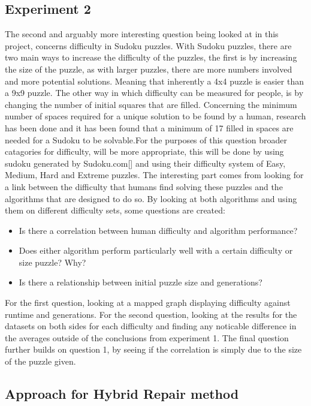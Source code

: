 \documentclass[a4paper,11pt]{article}
\begin{document}
\subsection{Experiment 2}
The second and arguably more interesting question being looked at in this project, concerns difficulty in Sudoku puzzles. With Sudoku puzzles, there are two main ways to increase the difficulty of the puzzles, the first is by increasing the size of the puzzle, as with larger puzzles, there are more numbers involved and more potential solutions. Meaning that inherently a 4x4 puzzle is easier than a 9x9 puzzle. The other way in which difficulty can be measured for people, is by changing the number of initial squares that are filled. Concerning the minimum number of spaces required for a unique solution to be found by a human, research has been done and it has been found that a minimum of 17 filled in spaces are needed for a Sudoku to be solvable.\newline \newline For the purposes of this question broader catagories for difficulty, will be more appropriate, this will be done by using sudoku generated by Sudoku.com[] and using their difficulty system of Easy, Medium, Hard and Extreme puzzles. The interesting part comes from looking for a link between the difficulty that humans find solving these puzzles and the algorithms that are designed to do so. By looking at both algorithms and using them on different difficulty sets, some questions are created:
\begin{itemize}
	\item Is there a correlation between human difficulty and algorithm performance?
	\item Does either algorithm perform particularly well with a certain difficulty or size puzzle? Why?
	\item Is there a relationship between initial puzzle size and generations?
\end{itemize}
For the first question, looking at a mapped graph displaying difficulty against runtime and generations. For the second question, looking at the results for the datasets on both sides for each difficulty and finding any noticable difference in the averages outside of the conclusions from experiment 1. The final question further builds on question 1, by seeing if the correlation is simply due to the size of the puzzle given.

\subsection{Approach for Hybrid Repair method}
\end{document}
